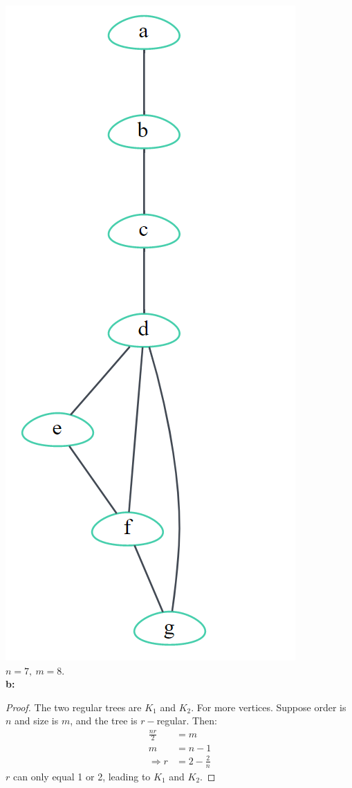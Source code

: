 \documentclass{article}
\begin{document}
\includegraphics[scale=0.3]{17_4.png}
$n=7,\ m=8.$\\
\textbf{b:}
\begin{proof}
The two regular trees are $K_1$ and $K_2$. For more vertices. Suppose order is $n$ and size is $m$, and the tree is $r-$regular. Then:
\begin{equation*}
\begin{aligned}
\frac{nr}{2}&=m\\
m&=n-1\\
\Rightarrow r&=2-\frac{2}{n}
\end{aligned}
\end{equation*}
$r$ can only equal 1 or 2, leading to $K_1$
and $K_2.$
\end{proof}
\end{document}
